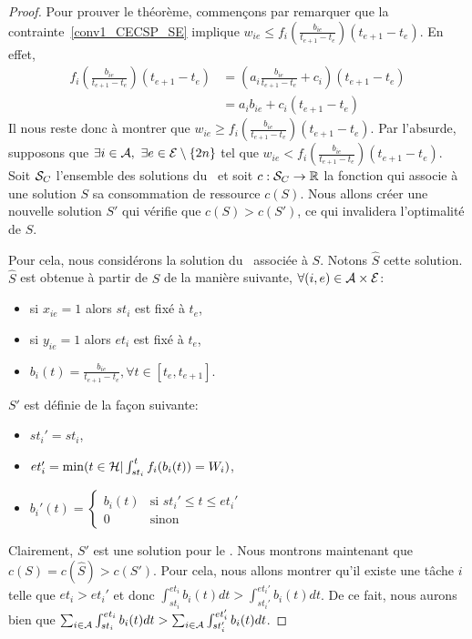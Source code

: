 \begin{proof}
Pour prouver le théorème, commençons par remarquer que la
contrainte~\eqref{conv1_CECSP_SE} implique
$w_{ie} \le f_i\left(\frac{b_{ie}}{t_{e+1}-t_e}\right)(t_{e+1}-t_e)$. En effet, 
\begin{align*}
  f_i\left(\frac{b_{ie}}{t_{e+1}-t_e}\right)(t_{e+1}-t_e)&
  =\left(a_i\frac{b_{ie}}{t_{e+1}-t_e}+c_i\right)(t_{e+1}-t_e)\\  
   &=a_ib_{ie}+c_i(t_{e+1}-t_e)
\end{align*}
Il nous reste donc à montrer que $w_{ie}\ge
f_i\left(\frac{b_{ie}}{t_{e+1}-t_e}\right)(t_{e+1}-t_e)$. Par l'absurde,
supposons que $\exists i \in \A,\ \exists e \in \E\setminus\{2n\}$
tel que $w_{ie} < 
f_i\left(\frac{b_{ie}}{t_{e+1}-t_e}\right)(t_{e+1}-t_e)$. Soit $\S_C$
l'ensemble des solutions du \CECSP~et soit  $c :\S_C
\rightarrow \mathbb{R}$ la fonction qui associe à une solution $S$ sa
consommation de ressource $c(S)$. Nous allons créer une nouvelle
solution $S'$ qui vérifie que $c(S)>c(S')$, ce qui invalidera
l'optimalité de $S$.

Pour cela, nous considérons la solution du \CECSP~associée à
$S$. Notons $\widehat{S}$ cette solution. $\widehat{S}$ est obtenue à
partir de $S$ de la manière suivante, $\forall (i,e)
\in \A \times \E$: 
\begin{itemize}
\item si $x_{ie}=1$ alors $st_i$ est fixé à $t_e$,
\item si $y_{ie}=1$ alors $et_i$ est fixé à $t_e$,
\item $b_i(t)=\frac{b_{ie}}{t_{e+1}-t_e}, \forall t \in [t_e,t_{e+1}]$. 
\end{itemize}

$S'$ est définie de la façon suivante: 
\begin{itemize}
\item $st_i'=st_i$,
\item $et_i'=\min(t \in \H | \int_{st_i}^t f_i(b_i(t)) = W_i)$,
\item $b_i'(t)=\left\{ \begin{array}{ll}
                         b_i(t)& \text{si } st_i' \le t \le et_i'\\ 
                         0 & \text{sinon}
                       \end{array}
                     \right.$
\end{itemize}
Clairement, $S'$ est une solution pour le \CECSP. Nous montrons
maintenant que $c(S) = c(\widehat{S})> c(S')$. Pour cela, nous allons montrer qu'il
existe une tâche $i$ telle que $et_i > et_i'$ et donc
$\int_{st_i}^{et_i} b_i(t)dt > \int_{st_i'}^{et_i'} b_i(t)dt$. De ce
fait, nous aurons bien que $\sum_{i \in \A} \int_{st_i}^{et_i}
b_i(t)dt > \sum_{i \in \A}\int_{st_i'}^{et_i'} b_i(t)dt$. 


\end{proof}
